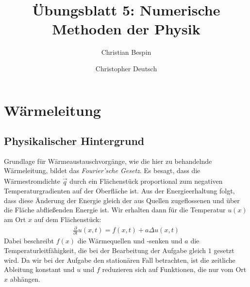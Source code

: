 \documentclass[10pt,a4paper]{article}
\author{Christian Bespin \and Christopher Deutsch}
\title{Übungsblatt 5: Numerische Methoden der Physik}
\begin{document}
\maketitle

\setcounter{section}{4}

\section{Wärmeleitung}

\subsection{Physikalischer Hintergrund}
Grundlage für Wärmeaustauschvorgänge, wie die hier zu behandelnde Wärmeleitung, bildet das \emph{Fourier'sche Gesetz}. Es besagt, dass die Wärmestromdichte $\dot{\vec{q}}$ durch ein Flächenstück proportional zum negativen Temperaturgradienten auf der Oberfläche ist. Aus der Energieerhaltung folgt, dass diese Änderung der Energie gleich der aus Quellen zugeflossenen und über die Fläche abfließenden Energie ist. Wir erhalten dann für die Temperatur $u(x)$ am Ort $x$ auf dem Flächenstück:
\begin{align}  
\frac{\partial}{\partial t}u(x,t)=f(x,t)+ a \Delta u(x,t)
\end{align}
Dabei beschreibt $f(x)$ die Wärmequellen und -senken und $a$ die Temperaturleitfähigkeit, die bei der Bearbeitung der Aufgabe gleich $1$ gesetzt wird. Da wir bei der Aufgabe den stationären Fall betrachten, ist die zeitliche Ableitung konstant und $u$ und $f$ reduzieren sich auf Funktionen, die nur vom Ort $x$ abhängen.
\end{document}
